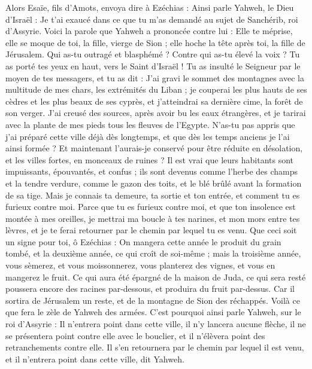 \begin{multicols}{2}
Alors Esaïe, fils d’Amots, envoya dire à Ezéchias : Ainsi parle Yahweh, le Dieu d’Israël : Je t’ai exaucé dans ce que tu m’as demandé au sujet de Sanchérib, roi d’Assyrie.
Voici la parole que Yahweh a prononcée contre lui : Elle te méprise, elle se moque de toi, la fille, vierge de Sion ; elle hoche la tête après toi, la fille de Jérusalem.
Qui as-tu outragé et blasphémé ? Contre qui as-tu élevé la voix ? Tu as porté tes yeux en haut, vers le Saint d’Israël !
Tu as insulté le Seigneur par le moyen de tes messagers, et tu as dit : J’ai gravi le sommet des montagnes avec la multitude de mes chars, les extrémités du Liban ; je couperai les plus hauts de ses cèdres et les plus beaux de ses cyprès, et j’atteindrai sa dernière cime, la forêt de son verger.
J’ai creusé des sources, après avoir bu les eaux étrangères, et je tarirai avec la plante de mes pieds tous les fleuves de l’Egypte.
N’as-tu pas appris que j’ai préparé cette ville déjà dès longtemps, et que dès les temps anciens je l’ai ainsi formée ? Et maintenant l’aurais-je conservé pour être réduite en désolation, et les villes fortes, en monceaux de ruines ?
Il est vrai que leurs habitants sont impuissants, épouvantés, et confus ; ils sont devenus comme l’herbe des champs et la tendre verdure, comme le gazon des toits, et le blé brûlé avant la formation de sa tige.
Mais je connais ta demeure, ta sortie et ton entrée, et comment tu es furieux contre moi.
Parce que tu es furieux contre moi, et que ton insolence est montée à mes oreilles, je mettrai ma boucle à tes narines, et mon mors entre tes lèvres, et je te ferai retourner par le chemin par lequel tu es venu.
Que ceci soit un signe pour toi, ô Ezéchias : On mangera cette année le produit du grain tombé, et la deuxième année, ce qui croît de soi-même ; mais la troisième année, vous sèmerez, et vous moissonnerez, vous planterez des vignes, et vous en mangerez le fruit.
Ce qui aura été épargné de la maison de Juda, ce qui sera resté poussera encore des racines par-dessous, et produira du fruit par-dessus.
Car il sortira de Jérusalem un reste, et de la montagne de Sion des réchappés. Voilà ce que fera le zèle de Yahweh des armées.
C’est pourquoi ainsi parle Yahweh, sur le roi d’Assyrie : Il n’entrera point dans cette ville, il n’y lancera aucune flèche, il ne se présentera point contre elle avec le bouclier, et il n’élèvera point des retranchements contre elle.
Il s’en retournera par le chemin par lequel il est venu, et il n’entrera point dans cette ville, dit Yahweh.

\end{multicols}
